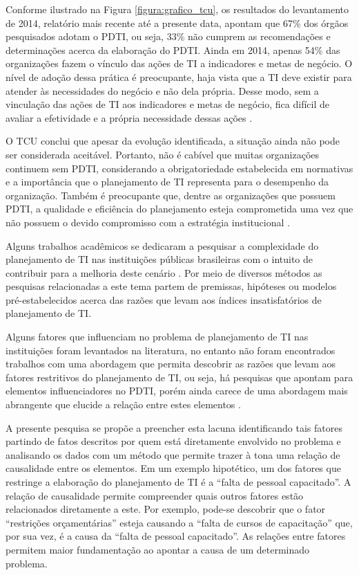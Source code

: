 Conforme ilustrado na Figura \ref{figura:grafico_tcu}, os resultados do levantamento de 2014, relatório mais recente até a presente data, apontam que 67\% dos órgãos pesquisados adotam o PDTI, ou seja, 33\% não cumprem as recomendações e determinações acerca da elaboração do PDTI. Ainda em 2014, apenas 54\% das organizações fazem o vínculo das ações de TI a indicadores e metas de negócio. O nível de adoção dessa prática é preocupante, haja vista que a TI deve existir para atender às necessidades do negócio e não dela própria. Desse modo, sem a vinculação das ações de TI aos indicadores e metas de negócio, fica difícil de avaliar a efetividade e a própria necessidade dessas ações \cite{tcu:14}. 

O TCU conclui que apesar da evolução identificada, a situação ainda não pode ser considerada aceitável. Portanto, não é cabível que muitas organizações continuem sem PDTI, considerando a obrigatoriedade estabelecida em normativas e a importância que o planejamento de TI representa para o desempenho da organização. Também é preocupante que, dentre as organizações que possuem PDTI, a qualidade e eficiência do planejamento esteja comprometida uma vez que não possuem o devido compromisso com a estratégia institucional \cite{tcu:14}.

Alguns trabalhos acadêmicos se dedicaram a pesquisar a complexidade do planejamento de TI nas instituições públicas brasileiras com o intuito de contribuir para a melhoria deste cenário \cite{paula:12, barros:13, prando:15}. Por meio de diversos métodos as pesquisas relacionadas a este tema partem de premissas, hipóteses ou modelos pré-estabelecidos acerca das razões que levam aos índices insatisfatórios de planejamento de TI. 

Alguns fatores que influenciam no problema de planejamento de TI nas instituições foram levantados na literatura, no entanto não foram encontrados trabalhos com uma abordagem que permita descobrir as razões que levam aos fatores restritivos do planejamento de TI, ou seja, há pesquisas que apontam para elementos influenciadores no PDTI, porém ainda carece de uma abordagem mais abrangente que elucide a relação entre estes elementos \cite{paula:12, barros:13, prando:15}. 

A presente pesquisa se propõe a preencher esta lacuna identificando tais fatores partindo de fatos descritos por quem está diretamente envolvido no problema e analisando os dados com um método que permite trazer à tona uma relação de causalidade entre os elementos. Em um exemplo hipotético, um dos fatores que restringe a elaboração do planejamento de TI é a ``falta de pessoal capacitado''. A relação de causalidade permite compreender quais outros fatores estão relacionados diretamente a este. Por exemplo, pode-se descobrir que o fator ``restrições orçamentárias'' esteja causando a ``falta de cursos de capacitação'' que, por sua vez, é a causa da ``falta de pessoal capacitado''. As relações entre fatores permitem maior fundamentação ao apontar a causa de um determinado problema.

